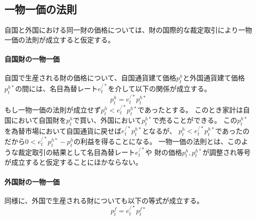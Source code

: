 
\subsection{一物一価の法則}
\label{sec:chapter3_assumptions_lop}
自国と外国における同一財の価格については、財の国際的な裁定取引により一物一価の法則が成立すると仮定する。

\paragraph{自国財の一物一価}
\label{sec:chapter3_assumptions_lop_home}
自国で生産される財の価格について、自国通貨建て価格\(p_t^h\)と外国通貨建て価格\(p_t^{h*}\)の間には、名目為替レート\(e_t^{/*}\)を介して以下の関係が成立する。
\begin{equation}
\label{form:chapter3_assumptions_lop_home_p_h_eq}
p_t^h=e_t^{/*}p_t^{h*}
\end{equation}
もし一物一価の法則が成立せず\(p_t^h<e_t^{/*}p_t^{h*}\)であったとする。
このとき家計は自国において自国財を\(p_t^h\)で買い、外国において\(p_t^{h*}\)で売ることができる。
この\(p_t^{h*}\)を為替市場において自国通貨に戻せば\(e_t^{/*}p_t^{h*}\)となるが、
\(p_t^h<e_t^{/*}p_t^{h*}\)であったのだから\(0<e_t^{/*}p_t^{h*}-p_t^h\)の利益を得ることになる。
一物一価の法則とは、このような裁定取引の結果として名目為替レート\(e_t^{/*}\)や
財の価格\(p_t^h,p_t^{h*}\)が調整され等号が成立すると仮定することにほかならない。

\paragraph{外国財の一物一価}
\label{sec:chapter3_assumptions_lop_foreign}
同様に、外国で生産される財についても以下の等式が成立する。
\begin{equation}
\label{form:chapter3_assumptions_lop_foreign_p_f_eq}
p_t^f=e_t^{/*}p_t^{f*}
\end{equation}